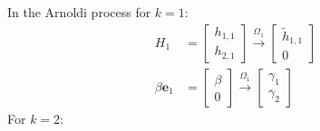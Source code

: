 In the Arnoldi process for $k=1$:
\begin{align*}
    H_1                & = \begin{bmatrix}
                               h_{1,1} \\
                               h_{2,1}
                           \end{bmatrix} \xrightarrow{\Omega_1} \begin{bmatrix}
                                                                    \tilde{h}_{1,1} \\
                                                                    0
                                                                \end{bmatrix} \\
    \beta \mathbf{e}_1 & = \begin{bmatrix}
                               \beta \\
                               0
                           \end{bmatrix} \xrightarrow{\Omega_1} \begin{bmatrix}
                                                                    \gamma_1 \\
                                                                    \gamma_2
                                                                \end{bmatrix}
\end{align*}
For $k=2$:
